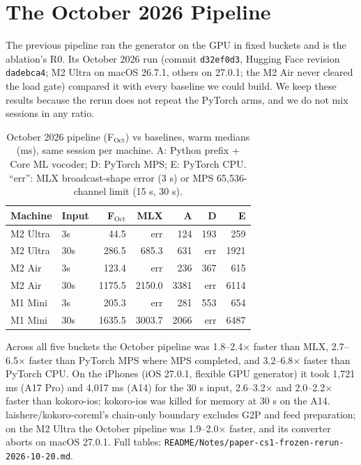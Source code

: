 \documentclass[11pt]{article}
\newcommand{\code}[1]{\texttt{#1}}
\begin{document}
\section{The October 2026 Pipeline}\label{app:october}

The previous pipeline ran the generator on the GPU in fixed buckets and is the ablation's R0. Its October 2026 run (commit \code{d32ef0d3}, Hugging Face revision \code{dadebca4}; M2 Ultra on macOS 26.7.1, others on 27.0.1; the M2 Air never cleared the load gate) compared it with every baseline we could build. We keep these results because the rerun does not repeat the PyTorch arms, and we do not mix sessions in any ratio.

\begin{table}[h]
\centering
\small
\caption{October 2026 pipeline (F$_\text{Oct}$) vs baselines, warm medians (ms), same session per machine. A: Python prefix + Core ML vocoder; D: PyTorch MPS; E: PyTorch CPU. ``err'': MLX broadcast-shape error (3 s) or MPS 65,536-channel limit (15 s, 30 s).}
\label{tab:october}
\begin{tabular}{llrrrrr}
\toprule
Machine & Input & F$_\text{Oct}$ & MLX & A & D & E \\
\midrule
M2 Ultra & 3s  & 44.5   & err    & 124  & 193  & 259  \\
M2 Ultra & 30s & 286.5  & 685.3  & 631  & err  & 1921 \\
M2 Air   & 3s  & 123.4  & err    & 236  & 367  & 615  \\
M2 Air   & 30s & 1175.5 & 2150.0 & 3381 & err  & 6114 \\
M1 Mini  & 3s  & 205.3  & err    & 281  & 553  & 654  \\
M1 Mini  & 30s & 1635.5 & 3003.7 & 2066 & err  & 6487 \\
\bottomrule
\end{tabular}
\end{table}

Across all five buckets the October pipeline was 1.8--2.4$\times$ faster than MLX, 2.7--6.5$\times$ faster than PyTorch MPS where MPS completed, and 3.2--6.8$\times$ faster than PyTorch CPU. On the iPhones (iOS 27.0.1, flexible GPU generator) it took 1,721 ms (A17 Pro) and 4,017 ms (A14) for the 30 s input, 2.6--3.2$\times$ and 2.0--2.2$\times$ faster than kokoro-ios; kokoro-ios was killed for memory at 30 s on the A14. laishere/kokoro-coreml's chain-only boundary excludes G2P and feed preparation; on the M2 Ultra the October pipeline was 1.9--2.0$\times$ faster, and its converter aborts on macOS 27.0.1. Full tables: \code{README/Notes/paper-cs1-frozen-rerun-2026-10-20.md}.
\end{document}
